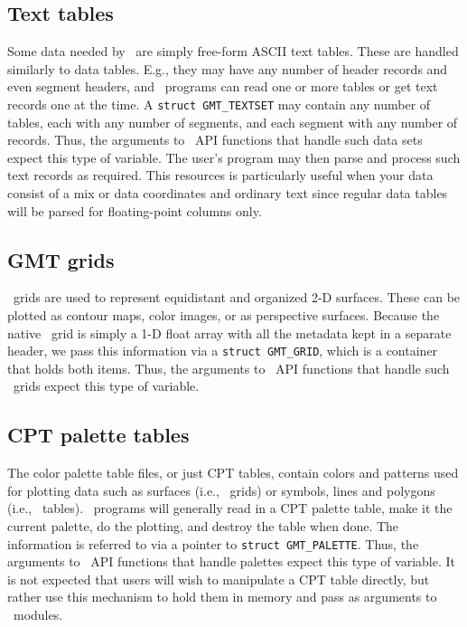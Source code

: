 \documentclass[11pt]{report}
\begin{document}
\subsection{Text tables}

Some data needed by \GMT\ are simply free-form ASCII text tables.  These are handled
similarly to data tables.  E.g., they may have any number of header records and even segment headers,
and \GMT\ programs can read one or more tables or get text records one at the time.
A \texttt{struct GMT\_TEXTSET} may contain
any number of tables, each with any number of segments, and each segment with any number of records.   Thus, the
arguments to \GMT\ API functions that handle such data sets expect this type of variable.  The user's
program may then parse and process such text records as required.  This resources is particularly useful
when your data consist of a mix or data coordinates and ordinary text since regular data tables will be
parsed for floating-point columns only.

\subsection{GMT grids}

\GMT\ grids are used to represent equidistant and organized 2-D surfaces.  These can be
plotted as contour maps, color images, or as perspective surfaces.  Because the native
\GMT\ grid is simply a 1-D float array with all the metadata kept in a separate header, we
pass this information via a \texttt{struct GMT\_GRID}, which is a container that holds both items.
Thus, the arguments to \GMT\ API functions that handle such \GMT\ grids expect this type
of variable.

\subsection{CPT palette tables}

The color palette table files, or just CPT tables, contain colors and patterns used for plotting
data such as surfaces (i.e., \GMT\ grids) or symbols, lines and polygons (i.e., \GMT\ tables).
\GMT\ programs will generally read in a CPT
palette table, make it the current palette, do the plotting, and destroy the table when done.
The information is referred to via a pointer to \texttt{struct GMT\_PALETTE}.  Thus, the
arguments to \GMT\ API functions that handle palettes expect this type of variable. It is not expected
that users will wish to manipulate a CPT table directly, but rather use this mechanism to hold them
in memory and pass as arguments to \GMT\ modules.
\end{document}
